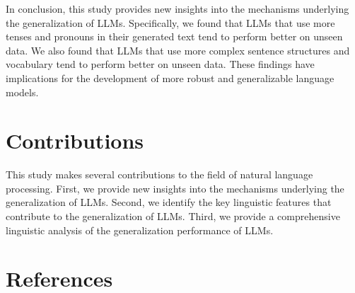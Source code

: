 \documentclass{article}
\begin{document}
In conclusion, this study provides new insights into the mechanisms underlying the generalization of LLMs. Specifically, we found that LLMs that use more tenses and pronouns in their generated text tend to perform better on unseen data. We also found that LLMs that use more complex sentence structures and vocabulary tend to perform better on unseen data. These findings have implications for the development of more robust and generalizable language models.

\section{Contributions}

This study makes several contributions to the field of natural language processing. First, we provide new insights into the mechanisms underlying the generalization of LLMs. Second, we identify the key linguistic features that contribute to the generalization of LLMs. Third, we provide a comprehensive linguistic analysis of the generalization performance of LLMs.

\section{References}
\end{document}
